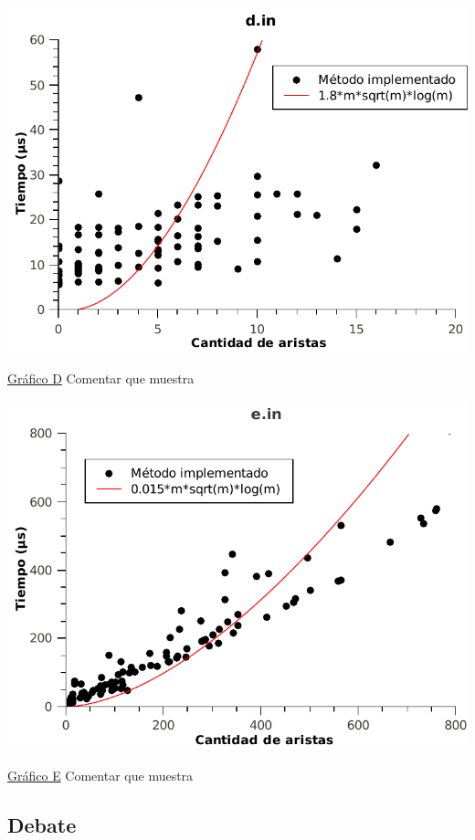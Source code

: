 \label{GraphD}
\hspace*{-2.1cm}\includegraphics[width=475pt]{../ej2/pruebas_graficos/GraphD.pdf}

\underline{Gráfico D} Comentar que muestra

\label{GraphE}
\hspace*{-2.1cm}\includegraphics[width=475pt]{../ej2/pruebas_graficos/GraphE.pdf}

\underline{Gráfico E} Comentar que muestra

\clearpage 


\subsection{Debate}
\label{deb2}

